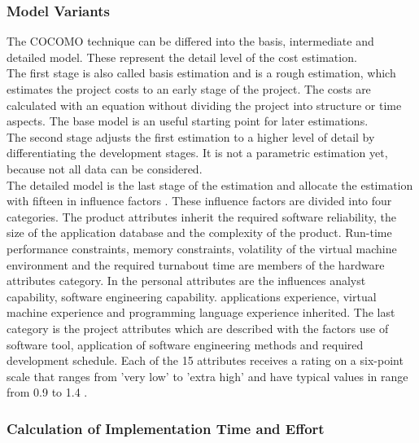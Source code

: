 \subsubsection{Model Variants}

The COCOMO technique can be differed into the basis, intermediate and detailed model. These represent the detail level of the cost estimation.\\
The first stage is also called basis estimation and is a rough estimation, which estimates the project costs to an early stage of the project. The costs are calculated with an equation without dividing the project into structure or time aspects. The base model is an useful starting point for later estimations.\\
The second stage adjusts the first estimation to a higher level of detail by differentiating the development stages. It is not a parametric estimation yet, because not all data can be considered.\\
The detailed model is the last stage of the estimation and allocate the estimation with fifteen in influence factors \cite{jenny}. These influence factors are divided into four categories. The product attributes inherit the required software reliability, the size of the application database and the complexity of the product. Run-time performance constraints, memory constraints, volatility of the virtual machine environment and the required turnabout time are members of the hardware attributes category. In the personal attributes are the influences analyst capability, software engineering capability. applications experience, virtual machine experience and programming language experience inherited. The last category is the project attributes which are described with the factors use of software tool, application of software engineering methods and required development schedule. Each of the 15 attributes receives a rating on a six-point scale that ranges from 'very low' to 'extra high' and have typical values in range from 0.9 to 1.4 .\\

\subsubsection{Calculation of Implementation Time and Effort}

